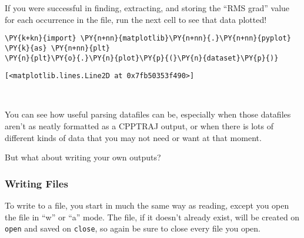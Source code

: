     If you were successful in finding, extracting, and storing the ``RMS
grad'' value for each occurrence in the file, run the next cell to see
that data plotted!

    \begin{tcolorbox}[breakable, size=fbox, boxrule=1pt, pad at break*=1mm,colback=cellbackground, colframe=cellborder]
\begin{Verbatim}[commandchars=\\\{\}]
\PY{k+kn}{import} \PY{n+nn}{matplotlib}\PY{n+nn}{.}\PY{n+nn}{pyplot} \PY{k}{as} \PY{n+nn}{plt}
\PY{n}{plt}\PY{o}{.}\PY{n}{plot}\PY{p}{(}\PY{n}{dataset}\PY{p}{)}
\end{Verbatim}
\end{tcolorbox}

            \begin{tcolorbox}[breakable, size=fbox, boxrule=.5pt, pad at break*=1mm, opacityfill=0]
\begin{Verbatim}[commandchars=\\\{\}]
[<matplotlib.lines.Line2D at 0x7fb50353f490>]
\end{Verbatim}
\end{tcolorbox}
        
    \begin{center}
    \end{center}
    { \hspace*{\fill} \\}
    
    You can see how useful parsing datafiles can be, especially when those
datafiles aren't as neatly formatted as a CPPTRAJ output, or when there
is lots of different kinds of data that you may not need or want at that
moment.

But what about writing your own outputs?

\hypertarget{writing-files}{%
\subsubsection{Writing Files}\label{writing-files}}

To write to a file, you start in much the same way as reading, except
you open the file in ``w'' or ``a'' mode. The file, if it doesn't
already exist, will be created on \texttt{open} and saved on
\texttt{close}, so again be sure to close every file you open.

